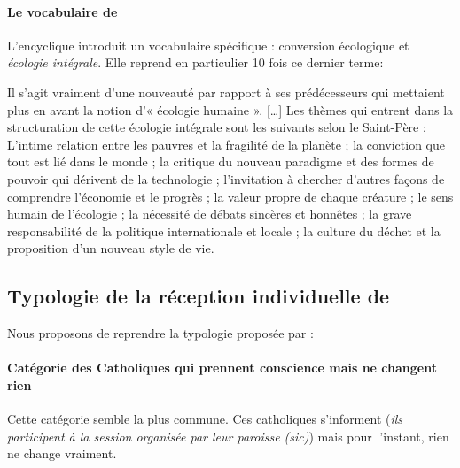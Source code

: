 \paragraph{Le vocabulaire de \LS }
L'encyclique introduit un vocabulaire spécifique : conversion écologique et \textit{écologie intégrale}. Elle reprend en particulier 10 fois ce dernier terme: 

\begin{singlequote}
Il s’agit vraiment d’une nouveauté par rapport à ses prédécesseurs qui mettaient plus en avant la notion d’« écologie humaine ». [\ldots] Les thèmes qui entrent dans la structuration de cette écologie intégrale sont les suivants selon le Saint-Père : L’intime relation entre les pauvres et la fragilité de la planète ; la conviction que tout est lié dans le monde ; la critique du nouveau paradigme et des formes de pouvoir qui dérivent de la technologie ; l’invitation à chercher d’autres façons de comprendre l’économie et le progrès ; la valeur propre de chaque créature ; le sens humain de l’écologie ; la nécessité de débats sincères et honnêtes ; la grave responsabilité de la politique internationale et locale ; la culture du déchet et la proposition d’un nouveau style de vie. \cite{revol_lencyclique_2016}
\end{singlequote}

\subsection{Typologie de la réception individuelle de \LS}  

Nous proposons de reprendre la typologie proposée par \cite[\textit{un an et demi après, que peut on dire de la reception de} \LS]{revol_reception_2017} :

\paragraph{Catégorie des Catholiques qui prennent conscience mais ne changent rien} Cette catégorie semble la plus commune. 
Ces catholiques s'informent (\textit{ils participent à la session organisée par leur paroisse (sic)}) mais pour l'instant, rien ne change vraiment.

